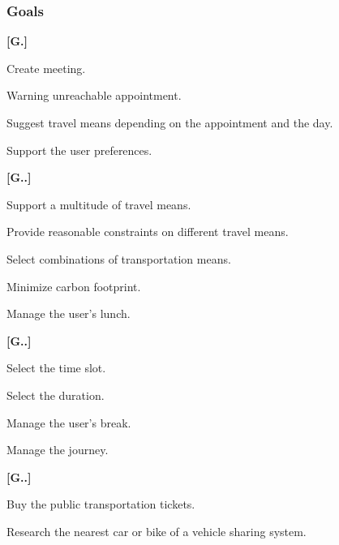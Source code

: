 \subsubsection{Goals}
\begin{list}
{\bfseries{}[G.]~}
{
}
\item
Create meeting.
\item
Warning unreachable appointment.
\item
Suggest travel means depending on the appointment and the day.
\item
Support the user preferences.
	\begin{list}
	{\bfseries{}[G..]~}
	{
	}
	\item
	Support a multitude of travel means.
	\item
	Provide reasonable constraints on different travel means.
	\item
	Select combinations of transportation means.
	\item
	Minimize carbon footprint.
	\end{list}
\item
Manage the user's lunch.
	\begin{list}
	{\bfseries{}[G..]~}
	{
	\usecounter{gcount2}
	}
	\item
	Select the time slot.
	\item
	Select the duration.
	\end{list}
\item
Manage the user's break.
\item
Manage the journey.
	\begin{list}
	{\bfseries{}[G..]~}
	{
	}
	\item
	Buy the public transportation tickets.
	\item
	Research the nearest car or bike of a vehicle sharing system.
	\end{list}
\end{list}

